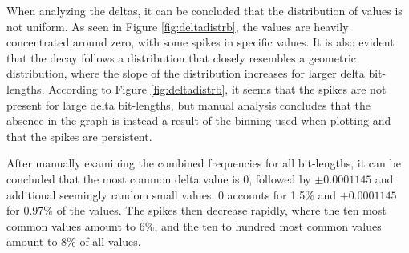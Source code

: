 When analyzing the deltas, it can be concluded that the distribution of values is not uniform. As seen in Figure \ref{fig:deltadistrb}, the values are heavily concentrated around zero, with some spikes in specific values. It is also evident that the decay follows a distribution that closely resembles a geometric distribution, where the slope of the distribution increases for larger delta bit-lengths. According to Figure \ref{fig:deltadistrb}, it seems that the spikes are not present for large delta bit-lengths, but manual analysis concludes that the absence in the graph is instead a result of the binning used when plotting and that the spikes are persistent.

After manually examining the combined frequencies for all bit-lengths, it can be concluded that the most common delta value is 0, followed by $\pm 0.0001145$ and additional seemingly random small values. 0 accounts for 1.5\% and $+ 0.0001145$ for 0.97\% of the values. The spikes then decrease rapidly, where the ten most common values amount to 6\%, and the ten to hundred most common values amount to 8\% of all values.

